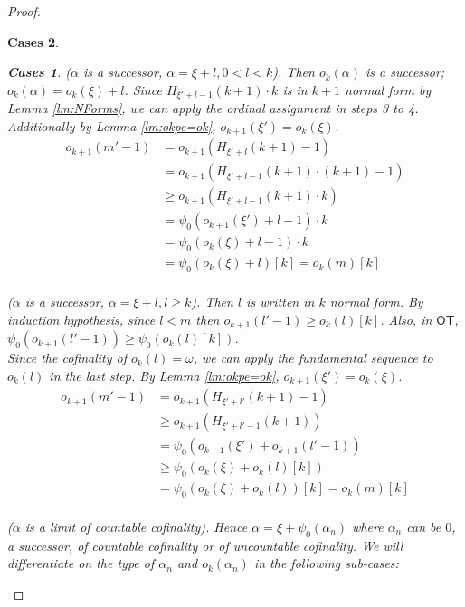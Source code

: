 \documentclass[10pt,a4paper]{amsart}
\newtheorem{Cases}{Cases}
\newcommand\OT{\mathsf{OT}}
\newcommand{\al}{{\alpha}}
\newcommand{\ok}{o_{k}}
\newcommand{\okpe}{o_{k+1}}
\newcommand{\om}{\omega}
\begin{document}
\begin{proof}
\begin{Cases}
\begin{Cases}
        \item ($\al$ is a successor, $\al = \xi + l, 0<l<k$). Then $\ok(\al)$ is a successor; $\ok(\al)= \ok(\xi)+l $. Since $H_{\xi'+l-1}(k+1) \cdot k $ is in $k+1$ normal form by Lemma \ref{lm:NForms}, we can apply the ordinal assignment in steps 3 to 4.\\ Additionally by Lemma \ref{lm:okpe=ok}, $\okpe(\xi')=\ok(\xi)$.
        \begin{align*} 
            \okpe(m'-1)& =\okpe(H_{\xi'+l} (k+1) -1)\\
            & = \okpe(H_{\xi'+l-1} (k+1) \cdot (k+1) -1)\\
            & \geq \okpe(H_{\xi'+l-1}  (k+1)\cdot k )\\
            & = \psi_0({\okpe(\xi') +l-1}) \cdot k \\
            &= \psi_0({\ok(\xi)} + l-1) \cdot k\\
            &= \psi_0(\ok(\xi)+ l)[k] =\ok(m)[k]\\
        \end{align*}
        
        \item ($\al$ is a successor, $\al=\xi+l, l\geq k$). Then $l$ is written in $k$ normal form. By induction hypothesis, since $l<m$ then $\okpe(l'-1)\geq \ok(l)[k]$. Also, in $\OT$, $\psi_0(\okpe(l'-1)) \geq \psi_0(\ok(l)[k])$.\\
        Since the cofinality of $\ok(l) =\om$, we can apply the fundamental sequence to $\ok(l)$ in the last step. 
        By Lemma \ref{lm:okpe=ok}, $\okpe(\xi')=\ok(\xi)$.
        \begin{align*} 
            \okpe(m'-1)& =\okpe(H_{\xi'+l'} (k+1) -1)\\
            & \geq \okpe(H_{\xi'+l'-1}  (k+1) )\\
            & = \psi_0({\okpe(\xi')} + \okpe(l'-1)) \\
            &\geq \psi_0({\ok(\xi)}+ \ok(l)[k])\\
            &=\psi_0({\ok(\xi)}+ \ok(l))[k]=\ok(m)[k]\\
        \end{align*}
        
        
        \item ($\al$ is a limit of countable cofinality). Hence $\al = \xi + \psi_0(\al_n)$ where $\al_n$ can be $0$, a successor, of countable cofinality or of uncountable cofinality. We will differentiate on the type of $\al_n$ and $\ok(\al_n)$ in the following sub-cases:\medskip
        

\end{Cases}
\end{Cases}
\end{proof}
\end{document}
